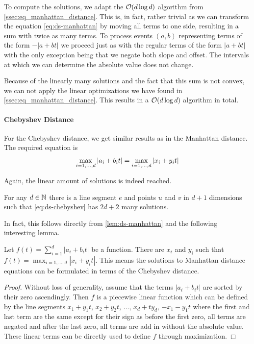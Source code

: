 To compute the solutions, we adapt the \(\mathcal{O}(d\log d)\) algorithm from \cref{ssec:eq_manhattan_distance}. This is, in fact, rather trivial as we can transform the equation \cref{eq:ds-manhattan} by moving all terms to one side, resulting in a sum with twice as many terms. To process events \((a, b)\) representing terms of the form \(-|a + bt|\) we proceed just as with the regular terms of the form \(|a+bt|\) with the only exception being that we negate both slope and offset. The intervals at which we can determine the absolute value does not change.

Because of the linearly many solutions and the fact that this sum is not convex, we can not apply the linear optimizations we have found in \cref{ssec:eq_manhattan_distance}. This results in a \(\mathcal{O}(d\log d)\) algorithm in total.

\paragraph{Chebyshev Distance}
For the Chebyshev distance, we get similar results as in the Manhattan distance. The required equation is 
\begin{equation}\label{eq:ds-chebyshev}
	\max_{i=1, \dots, d} \left|a_i + b_i t\right| = \max_{i=1, \dots, d} \left|x_i + y_i t\right|
\end{equation}

Again, the linear amount of solutions is indeed reached.

\begin{lemma}
	For any \(d \in \mathbb{N}\) there is a line segment \(e\) and points \(u\) and \(v\) in \(d+1\) dimensions such that \cref{eq:ds-chebyshev} has \(2d + 2\) many solutions. 
\end{lemma}

In fact, this follows directly from \cref{lem:ds-manhattan} and the following interesting lemma.

\begin{lemma}\label{lem:manhattan-is-chebyshev}
	Let \(f(t) = \sum_{i=1}^d |a_i + b_i t|\) be a function. There are \(x_i\) and \(y_i\) such that \(f(t) = \max_{i=1, \dots, d} |x_i + y_i t|\). This means the solutions to Manhattan distance equations can be formulated in terms of the Chebyshev distance.
\end{lemma}

\begin{proof}
	Without loss of generality, assume that the terms \(|a_i + b_i t|\) are sorted by their zero ascendingly. Then \(f\) is a piecewise linear function which can be defined by the line segments \(x_1 + y_1 t\), \(x_2 + y_2 t\), \(\dots\), \(x_d + t y_d\), \(-x_1 - y_1 t\) where the first and last term are the same except for their sign as before the first zero, all terms are negated and after the last zero, all terms are add in without the absolute value. These linear terms can be directly used to define \(f\) through maximization. 
\end{proof}

